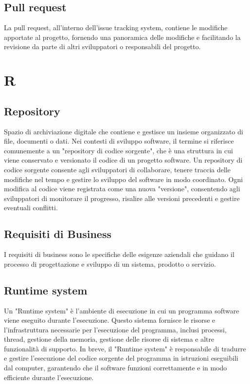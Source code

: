 \documentclass{article}
\begin{document}
\subsection{Pull request}
La pull request, all'interno dell'issue tracking system, contiene le modifiche apportate al progetto, fornendo una panoramica delle modifiche e facilitando la revisione da parte di altri sviluppatori o responsabili del progetto.

\section{R}
\subsection{Repository}
Spazio di archiviazione digitale che contiene e gestisce un insieme organizzato di file, documenti o dati. Nei contesti di sviluppo software, il termine si riferisce comunemente a un "repository di codice sorgente", che è una struttura in cui viene conservato e versionato il codice di un progetto software. Un repository di codice sorgente consente agli sviluppatori di collaborare, tenere traccia delle modifiche nel tempo e gestire lo sviluppo del software in modo coordinato. Ogni modifica al codice viene registrata come una nuova "versione", consentendo agli sviluppatori di monitorare il progresso, risalire alle versioni precedenti e gestire eventuali conflitti.

\subsection{Requisiti di Business}
I  requisiti di business sono le specifiche delle esigenze aziendali che guidano il processo di progettazione e sviluppo di un sistema, prodotto o servizio.

\subsection{Runtime system}
Un "Runtime system" è l'ambiente di esecuzione in cui un programma software viene eseguito durante l'esecuzione. Questo sistema fornisce le risorse e l'infrastruttura necessarie per l'esecuzione del programma, inclusi processi, thread, gestione della memoria, gestione delle risorse di sistema e altre funzionalità di supporto. In breve, il "Runtime system" è responsabile di tradurre e gestire l'esecuzione del codice sorgente del programma in istruzioni eseguibili dal computer, garantendo che il software funzioni correttamente e in modo efficiente durante l'esecuzione.
\end{document}
